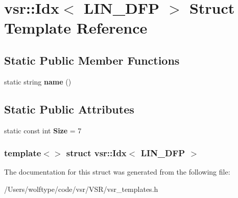 \hypertarget{structvsr_1_1_idx_3_01_l_i_n___d_f_p_01_4}{\section{vsr\-:\-:Idx$<$ L\-I\-N\-\_\-\-D\-F\-P $>$ Struct Template Reference}
\label{structvsr_1_1_idx_3_01_l_i_n___d_f_p_01_4}
}
\subsection*{Static Public Member Functions}
\begin{DoxyCompactItemize}
\item 
\hypertarget{structvsr_1_1_idx_3_01_l_i_n___d_f_p_01_4_abd3560938a2e3e2e476ed3646271fe08}{static string {\bfseries name} ()}\label{structvsr_1_1_idx_3_01_l_i_n___d_f_p_01_4_abd3560938a2e3e2e476ed3646271fe08}

\end{DoxyCompactItemize}
\subsection*{Static Public Attributes}
\begin{DoxyCompactItemize}
\item 
\hypertarget{structvsr_1_1_idx_3_01_l_i_n___d_f_p_01_4_a44e06cc2f8cee3ee739e3232199d1804}{static const int {\bfseries Size} = 7}\label{structvsr_1_1_idx_3_01_l_i_n___d_f_p_01_4_a44e06cc2f8cee3ee739e3232199d1804}

\end{DoxyCompactItemize}
\subsubsection*{template$<$$>$ struct vsr\-::\-Idx$<$ L\-I\-N\-\_\-\-D\-F\-P $>$}



The documentation for this struct was generated from the following file\-:\begin{DoxyCompactItemize}
\item 
/\-Users/wolftype/code/vsr/\-V\-S\-R/vsr\-\_\-templates.\-h\end{DoxyCompactItemize}

